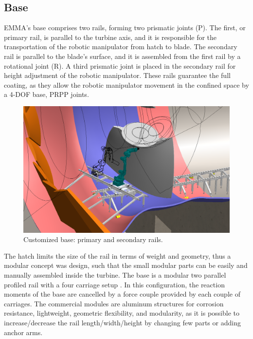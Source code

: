 
 

\subsection{Base}

EMMA's base comprises two rails, forming two prismatic joints (P). The
first, or primary rail, is parallel to the turbine axis, and it is responsible
for the transportation of the robotic manipulator from hatch to blade. The
secondary rail is parallel to the blade's surface, and it is assembled from the
first rail by a rotational joint (R). A third prismatic joint
is placed in the secondary rail for height adjustment of the robotic
manipulator. These rails guarantee the full coating, as they allow the
robotic manipulator movement in the confined space by a 4-DOF base, PRPP joints.

\begin{figure}
	\centering
	\includegraphics[width=.8\columnwidth]{figs/mecanica/EMMA_Base_Secundaria_01.PNG}
    \caption{Customized base: primary and secondary rails.}
    \label{fig:base}
\end{figure}

The hatch limits the size of the rail in terms of weight and geometry, thus a
modular concept was design, such that the small modular parts can be easily and
manually assembled inside the turbine. The base is a modular two parallel
profiled rail with a four carriage setup  \cite{SKF_2013}. In this
configuration, the reaction moments of the base are cancelled by a force couple provided by each couple of
carriages. The commercial modules are aluminum structures for corrosion resistance,
lightweight, geometric flexibility, and modularity, as it is possible to
increase/decrease the rail length/width/height by changing few parts or adding
anchor arms.

